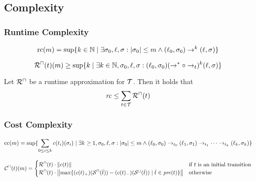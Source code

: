 \subsection{Complexity}

\subsubsection{Runtime Complexity}

\begin{definition}
  \[ \text{rc}(m) = \sup \lbrace  k \in \mathbb{N} \mid \exists \sigma_0, \ell, \sigma: \left|\sigma_0\right| \leq m \wedge (\ell_0, \sigma_0) \rightarrow^k (\ell, \sigma)  \rbrace \]
\end{definition}

\begin{definition}
  \[ {\mathcal{R}^\sqcap}(t)(m) \geq \sup \lbrace  k \mid \exists k \in \mathbb{N}, \sigma_0, \ell, \sigma: (\ell_0, \sigma_0) (\rightarrow^* \circ \rightarrow_t)^k (\ell, \sigma)  \rbrace \]
\end{definition}

\begin{theorem}
	Let ${\mathcal{R}^\sqcap}$ be a runtime approximation for $\mathcal{T}$.
	Then it holds that 
	\[ \mathit{rc} \leq \sum_{t \in \mathcal{T}}{\mathcal{R}^\sqcap}(t) \]
\end{theorem}

\subsubsection{Cost Complexity}

\begin{definition}
\[ \text{cc}(m) = \sup \lbrace  \sum_{0 \leq i \leq k} c(t_i)(\sigma_i) \mid \exists k \geq 1, \sigma_0, \ell, \sigma: \left|\sigma_0\right| \leq m \wedge
  (\ell_0, \sigma_0) \rightarrow_{t_0} (\ell_1, \sigma_1) \rightarrow_{t_1} \dots \rightarrow_{t_k} (\ell_k, \sigma_k)  \rbrace \]
\end{definition}

\begin{definition}
  \[ {\mathcal{C}^\sqcap}(t)(m) =
  \begin{cases}
    {\mathcal{R}^\sqcap}(t) \cdot \left\Vert c(t)\right\Vert & \text{if } t \text{ is an initial transition} \\
    {\mathcal{R}^\sqcap}(t) \cdot \left\Vert\max \lbrace (c(t)_+)({\mathcal{S}^\sqcap}(\tilde{t})) - (c(t)_-)({\mathcal{S}^\sqcup}(\tilde{t})) \mid \tilde{t} \in \mathit{pre}(t) \rbrace\right\Vert & \text{otherwise}
  \end{cases}
  \]
\end{definition}

